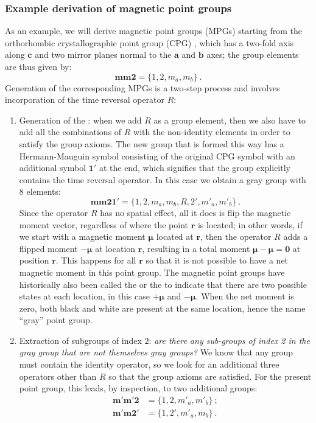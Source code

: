 \subsubsection{Example derivation of magnetic point groups}
As an example, we will derive magnetic point groups (MPGs) starting from the orthorhombic crystallographic point group (CPG) , which has a two-fold axis along $\mathbf{c}$ and two mirror planes normal to the $\mathbf{a}$ and $\mathbf{b}$ axes; the group elements are thus given by:
\[
	\mathbf{mm2} = \{1, 2, m_a, m_b \}\ .
\]
Generation of the corresponding MPGs is a two-step process and involves incorporation of the time reversal operator $R$:
\begin{enumerate}
	\item Generation of the :  when we add $R$ as a group element, then we also have to add all the combinations of $R$ with the non-identity elements in order to satisfy the group axioms. The new group that is formed this way has a Hermann-Mauguin symbol consisting of the original CPG symbol with an additional symbol $\mathbf{1'}$ at the end, which signifies that the group explicitly contains the time reversal operator.  In this case we obtain a gray group with $8$ elements:
	\[
		\mathbf{mm21'} = \{1, 2, m_a, m_b, R, 2', m'_a, m'_b \}\ .
	\]
Since the operator $R$ has no spatial effect, all it does is flip the magnetic moment vector, regardless of where the point $\mathbf{r}$ is located; in other words, if we start with a magnetic moment $\bm{\mu}$ located at $\mathbf{r}$, then the operator $R$ adds a flipped moment $-\bm{\mu}$ at location $\mathbf{r}$, resulting in a total moment $\bm{\mu}-\bm{\mu}=\mathbf{0}$ at position $\mathbf{r}$.  This happens for all $\mathbf{r}$ so that it is not possible to have a net magnetic moment in this point group.  	The magnetic point groups have historically also been called the  or the  to indicate that there are two possible states at each location, in this case $+\bm{\mu}$ and $-\bm{\mu}$. When the net moment is zero, both black and white are present at the same location, hence the name ``gray'' point group.

	\item Extraction of subgroups of index $2$: \textit{are there any sub-groups of index 2 in the gray group that are not themselves gray groups?}  We know that any group must contain the identity operator, so we look for an additional three operators other than $R$ so that the group axioms are satisfied.  For the present point group, this leads, by inspection, to two additional groups:
	\begin{equation*}
	\begin{split}
		\mathbf{m'm'2} &= \{1, 2,  m'_a, m'_b \}\ ;\\
		\mathbf{m'm2'} &= \{1, 2',  m'_a, m_b \}\ .	 
	\end{split}
	\end{equation*}
\end{enumerate}

